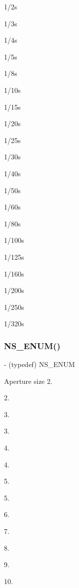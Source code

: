 1/2s

1/3s

1/4s

1/5s

1/8s

1/10s

1/15s

1/20s

1/25s

1/30s

1/40s

1/50s

1/60s

1/80s

1/100s

1/125s

1/160s

1/200s

1/250s

1/320s\mbox{\label{interface_p_v_eye_camera_settings_def_afa6a248e45959a999b5307f3dbf38fa7}} 
\subsubsection{\texorpdfstring{N\+S\+\_\+\+E\+N\+U\+M()}{NS\_ENUM()}\hspace{0.1cm}{\footnotesize\ttfamily [12/17]}}
{\footnotesize\ttfamily -\/ (typedef) N\+S\+\_\+\+E\+N\+UM \begin{DoxyParamCaption}\item[{(N\+S\+U\+Integer)}]{ }\item[{(P\+V\+Eye\+Camera\+Aperture)}]{ }\end{DoxyParamCaption}}

Aperture size 2.

2.

3.

3.

4.

4.

5.

5.

6.

7.

8.

9.

10.

